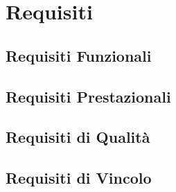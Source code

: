 \section{Requisiti}

\subsection{Requisiti Funzionali}

\subsection{Requisiti Prestazionali}

\subsection{Requisiti di Qualità}

\subsection{Requisiti di Vincolo}